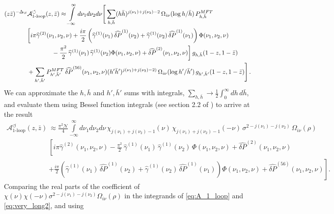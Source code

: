 \begin{align}
(z\bar{z})^{-\Delta_{\f}}& \mathcal{A}_{\text{1-loop}}^{\circlearrowleft}(z,\bar{z}) \approx \int\limits_{-\infty}^{\infty} d\nu_{1}d\nu_2d\nu \Bigg[\sum_{h,\bar{h}}  (h\bar{h})^{j(\nu_1) +j(\nu_2) -2}\,\Omega_{i\nu}(\log h/\bar{h})\, P^{MFT}_{h,\bar{h}}  
\label{eq:very_long}    \\
& \bigg[i\pi \widehat{\gamma}^{(2)}(\nu_1,\nu_2,\nu)  + \frac{i\pi}{2}\left(\widehat{\gamma}^{(1)}(\nu_1)\,\widehat{\delta P}^{(1)}(\nu_2) + \widehat{\gamma}^{(1)}(\nu_2)\,\widehat{\delta P}^{(1)}(\nu_1)\right)\Phi(\nu_1,\nu_2,\nu)   \nonumber\\
		&  \qquad  \qquad -\frac{\pi^2}{2}\,\widehat{\gamma}^{(1)}(\nu_1)\,\widehat{\gamma}^{(1)}(\nu_2)\Phi(\nu_1,\nu_2,\nu) + \widehat{\delta P}^{(2)}(\nu_1,\nu_2,\nu)   \bigg]\, g_{h,\bar{h}}(1-z,1-\bar{z}) \nonumber \\
		&  + \sum_{h',\bar{h}'} P^{MFT}_{h',\bar{h}'} \,\widehat{\delta P}^{(56)}(\nu_1,\nu_2,\nu) (h'\bar{h}')^{j(\nu_1) +j(\nu_2) -2)}\,\Omega_{i\nu}(\log h'/\bar{h}') \,g_{h',\bar{h}'}(1-z,1-\bar{z}) \Bigg]\,.
		 \nonumber
\end{align}
We can approximate the $h,\bar{h}$ and $h',\bar{h}'$ sums with integrals, $\sum_{h,\bar{h}} \rightarrow \frac{1}{2}\int_{0}^{\infty}dh\, d\bar{h}$, and evaluate them using Bessel function integrals (see section 2.2 of \cite{Meltzer:2019pyl}) to arrive at the result
\begin{align}
\mathcal{A}_{\text{1-loop}}^{\circlearrowleft}(z,\bar{z})&\approx \frac{\pi^2 \mathcal{N}}{4}\int\limits_{-\infty}^{\infty} d\nu_{1}d\nu_2d\nu \, \chi_{j(\nu_1)+j(\nu_2)-1}(\nu)\,\chi_{j(\nu_1)+j(\nu_2)-1}(-\nu) \,
 			\sigma^{2-j(\nu_1)-j(\nu_2)} \,\Omega_{i\nu}(\rho) \nonumber  \\
		& \left[ i\pi \widehat{\gamma}^{(2)}(\nu_1,\nu_2,\nu)  -\frac{\pi^2}{2}\,\widehat{\gamma}^{(1)}(\nu_1)\,\widehat{\gamma}^{(1)}(\nu_2)\,\Phi(\nu_1,\nu_2,\nu) + \widehat{\delta P}^{(2)}(\nu_1,\nu_2,\nu) \right.  
\label{eq:very_long2}  \\
		&  \left. + \frac{i\pi}{2}\left(\widehat{\gamma}^{(1)}(\nu_1)\,\widehat{\delta P}^{(1)}(\nu_2) + \widehat{\gamma}^{(1)}(\nu_2)\,\widehat{\delta P}^{(1)}(\nu_1)\right)\Phi(\nu_1,\nu_2,\nu) + \widehat{\delta P}^{(56)}(\nu_1,\nu_2,\nu) \right] .
\nonumber
\end{align}
Comparing the real parts of the coefficient of $\chi(\nu)\chi(-\nu)\sigma^{2-j(\nu_1)-j(\nu_2)} \Omega_{i\nu}(\rho)$ in the integrands of \eqref{eq:A_1_loop} and \eqref{eq:very_long2}, and using
